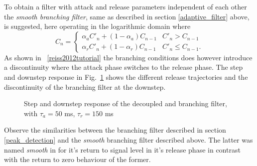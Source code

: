 \documentclass[../main2.tex]{subfiles}
\providecommand{\rootdir}{..}
\begin{document}
To obtain a filter with attack and release parameters independent of each other the \emph{smooth branching filter}, same as described in section \ref{adaptive_filter} above, is suggested, here operating in the logarithmic domain where 
\begin{equation}\label{eq:smooth_branching_det}
C_n = \begin{cases}
    \alpha_{a} C'_n + (1-\alpha_{a}) C_{n-1} 	& C'_n > C_{n-1} \\
    \alpha_{r} C'_n + (1-\alpha_{r}) C_{n-1} 	& C'_n \leq C_{n-1}.
\end{cases}
\end{equation}
As shown in ~\ref{reiss2012tutorial} the branching conditions does however introduce a discontinuity where the attack phase switches to the release phase. The step and downstep response in Fig.~\ref{fig:step_reiss_filter} shows the different release trajectories and the discontinuity of the branching filter at the downstep.
\begin{figure}
\centerline{}
\caption{Step and downstep response of the decoupled and branching filter, with $\tau_a = 50$ ms, $\tau_r = 150$ ms}
\label{fig:step_reiss_filter}
\end{figure}
 Observe the similarities between the branching filter described in section \ref{peak_detection} and the \emph{smooth} branching filter described above. The latter was named \emph{smooth} in \cite{reiss2012tutorial} for it's return to signal level in it's release phase in contrast with the return to zero behaviour of the former.
\end{document}
